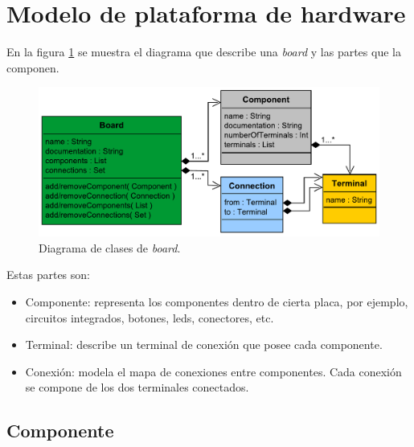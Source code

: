 \section{Modelo de plataforma de hardware}
\label{sec:modelHardware}

En la figura \ref{fig:ModelBoard} se muestra el diagrama que describe una \emph{board} y las partes que la componen.

\begin{figure}[!htbp]
\begin{center}  %
\includegraphics*[width=14cm]{Figures/Board.pdf}
\par\caption{Diagrama de clases de \emph{board}.}\label{fig:ModelBoard}
\end{center}
\end{figure}

Estas partes son:

\begin{itemize}
\item
Componente: representa los componentes dentro de cierta placa, por ejemplo, circuitos integrados, botones, leds, conectores, etc. 
\item
Terminal: describe un terminal de conexión que posee cada componente.
\item
Conexión: modela el mapa de conexiones entre componentes. Cada conexión se compone de los dos terminales conectados.
\end{itemize}

\subsection{Componente}

